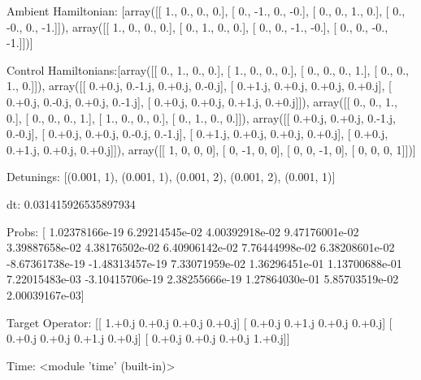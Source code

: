 \documentclass{article}
\begin{document}
    

\newpage

Ambient Hamiltonian: [array([[ 1.,  0.,  0.,  0.],
       [ 0., -1.,  0., -0.],
       [ 0.,  0.,  1.,  0.],
       [ 0., -0.,  0., -1.]]), array([[ 1.,  0.,  0.,  0.],
       [ 0.,  1.,  0.,  0.],
       [ 0.,  0., -1., -0.],
       [ 0.,  0., -0., -1.]])]

Control Hamiltonians:[array([[ 0.,  1.,  0.,  0.],
       [ 1.,  0.,  0.,  0.],
       [ 0.,  0.,  0.,  1.],
       [ 0.,  0.,  1.,  0.]]), array([[ 0.+0.j,  0.-1.j,  0.+0.j,  0.-0.j],
       [ 0.+1.j,  0.+0.j,  0.+0.j,  0.+0.j],
       [ 0.+0.j,  0.-0.j,  0.+0.j,  0.-1.j],
       [ 0.+0.j,  0.+0.j,  0.+1.j,  0.+0.j]]), array([[ 0.,  0.,  1.,  0.],
       [ 0.,  0.,  0.,  1.],
       [ 1.,  0.,  0.,  0.],
       [ 0.,  1.,  0.,  0.]]), array([[ 0.+0.j,  0.+0.j,  0.-1.j,  0.-0.j],
       [ 0.+0.j,  0.+0.j,  0.-0.j,  0.-1.j],
       [ 0.+1.j,  0.+0.j,  0.+0.j,  0.+0.j],
       [ 0.+0.j,  0.+1.j,  0.+0.j,  0.+0.j]]), array([[ 1,  0,  0,  0],
       [ 0, -1,  0,  0],
       [ 0,  0, -1,  0],
       [ 0,  0,  0,  1]])]

Detunings: [(0.001, 1), (0.001, 1), (0.001, 2), (0.001, 2), (0.001, 1)]

 dt: 0.031415926535897934

Probs: [  1.02378166e-19   6.29214545e-02   4.00392918e-02   9.47176001e-02
   3.39887658e-02   4.38176502e-02   6.40906142e-02   7.76444998e-02
   6.38208601e-02  -8.67361738e-19  -1.48313457e-19   7.33071959e-02
   1.36296451e-01   1.13700688e-01   7.22015483e-03  -3.10415706e-19
   2.38255666e-19   1.27864030e-01   5.85703519e-02   2.00039167e-03]

Target Operator: [[ 1.+0.j  0.+0.j  0.+0.j  0.+0.j]
 [ 0.+0.j  0.+1.j  0.+0.j  0.+0.j]
 [ 0.+0.j  0.+0.j  0.+1.j  0.+0.j]
 [ 0.+0.j  0.+0.j  0.+0.j  1.+0.j]]

Time: <module 'time' (built-in)>
\end{document}
